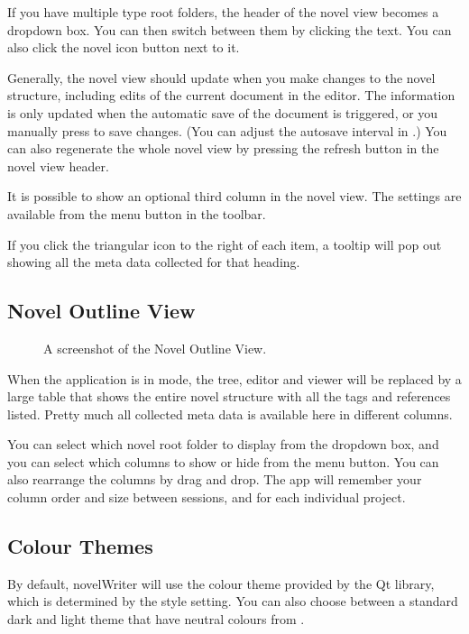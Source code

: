 \documentclass[a4paper,11pt,english]{sphinxmanual}
\begin{document}
\sphinxAtStartPar
If you have multiple  type root folders, the header of the novel view becomes a dropdown
box. You can then switch between them by clicking the  text. You can also
click the novel icon button next to it.

\sphinxAtStartPar
Generally, the novel view should update when you make changes to the novel structure, including
edits of the current document in the editor. The information is only updated when the automatic
save of the document is triggered, or you manually press  to save changes. (You can
adjust the auto\sphinxhyphen{}save interval in .) You can also regenerate the whole novel view by
pressing the refresh button in the novel view header.

\sphinxAtStartPar
It is possible to show an optional third column in the novel view. The settings are available from
the menu button in the toolbar.

\sphinxAtStartPar
If you click the triangular icon to the right of each item, a tooltip will pop out showing all the
meta data collected for that heading.


\subsection{Novel Outline View}
\label{\detokenize{usage_breakdown:novel-outline-view}}
\begin{figure}[htbp]
\centering
\capstart

\noindent{}
\caption{A screenshot of the Novel Outline View.}\label{\detokenize{usage_breakdown:id3}}\end{figure}

\sphinxAtStartPar
When the application is in  mode, the tree, editor and viewer will be
replaced by a large table that shows the entire novel structure with all the tags and references
listed. Pretty much all collected meta data is available here in different columns.

\sphinxAtStartPar
You can select which novel root folder to display from the dropdown box, and you can select which
columns to show or hide from the menu button. You can also rearrange the columns by drag and drop.
The app will remember your column order and size between sessions, and for each individual project.


\subsection{Colour Themes}
\label{\detokenize{usage_breakdown:colour-themes}}
\sphinxAtStartPar
By default, novelWriter will use the colour theme provided by the Qt library, which is determined
by the  style setting. You can also choose between a standard dark and light theme that have
neutral colours from .
\end{document}
